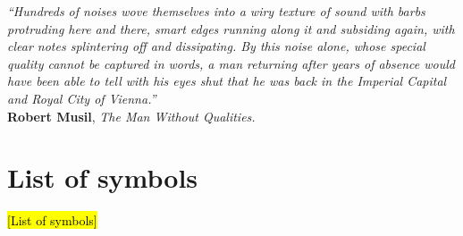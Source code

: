 \documentclass[final,twoside,11pt]{book}
\makeatletter
\numberwithin{equation}{section}
\numberwithin{figure}{chapter}
\numberwithin{table}{chapter}
\def\cleardoublepage{\clearpage\if@twoside \ifodd\c@page\else
  \hbox{}
  \thispagestyle{empty}
  \newpage
  \if@twocolumn\hbox{}\newpage\fi\fi\fi}
\makeatother
\begin{document}
\begin{flushright}
\begin{minipage}[t]{0.75\textwidth}



\linespread{0.97}\selectfont
{\itshape\small``Hundreds of noises wove themselves into a wiry texture of sound with barbs protruding here and there, smart edges running along it and subsiding again, with clear notes splintering off and dissipating. By this noise alone, whose special quality cannot be captured in words, a man returning after years of absence would have been able to tell with his eyes shut that he was back in the Imperial Capital and Royal City of Vienna.''}\\[-3mm]

{\cabincondensed\small\hfill \textbf{Robert Musil}, \emph{The Man Without Qualities.}}
\end{minipage}
\end{flushright}

\cleardoublepage

\tableofcontents
\cleardoublepage

\listoffigures
\cleardoublepage

\listoftables
\cleardoublepage

\chapter*{List of symbols}
\hl{[List of symbols]}
\cleardoublepage

\end{document}
